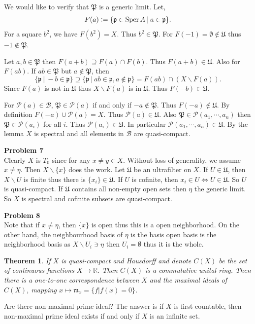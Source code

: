 \documentclass[10pt]{article}
\numberwithin{equation}{section}
\newtheorem{theorem}{Theorem} [section]
\DeclareMathOperator{\Sper}{Sper}
\newcommand{\defeq}{\vcentcolon=}
\newcommand{\m}[0]{\mathfrak{m}}
\newcommand{\R}[0]{\mathbb{R}}
\newcommand{\U}[0]{\mathfrak{U}}
\newcommand{\sep}[0]{\:|\:}
\newcommand{\p}[0]{\mathfrak{p}}
\begin{document}
 We would like to verify that $\mathfrak{P}$ is a generic limit. Let,
 \begin{equation*}
  F(a) \defeq \{\p\in\Sper A\sep a\in\p\}.
 \end{equation*} 
 For a square $b^2$, we have $F(b^2) = X$. Thus $b^2\in \mathfrak{P}$. For $F(-1) = \emptyset\not\in\U$ thus $-1\not\in \mathfrak{P}$.
 \par Let $a,b\in\mathfrak{P}$ then $F(a+b)\supseteq F(a)\cap F(b)$. Thus $F(a+b)\in\U$. Also for $F(ab)$. If $ab\in\mathfrak{P}$ but $a\not\in \mathfrak{P}$, then 
 \begin{equation*}
  \{\p\sep -b\in\p\}\supseteq\{\p\sep ab\in\p,a\not\in\p\} = F(ab)\cap (X\backslash F(a)).
 \end{equation*}
Since $F(a)$ is not in $\U$ thus $X\backslash F(a)$ is in $\U$. Thus $F(-b)\in\U$. 
\par For $\mathcal{P}(a)\in\mathcal{B}$, $\mathfrak{P}\in\mathcal{P}(a)$ if and only if $-a\not\in \mathfrak{P}$. Thus $F(-a)\not\in \U$. By definition $F(-a)\cup \mathcal{P}(a)=X$. Thus $\mathcal{P}(a)\in\U$.
Also $\mathfrak{P}\in\mathcal{P}(a_1,\cdots,a_n)$ then $\mathfrak{P}\in\mathcal{P}(a_i)$ for all $i$. Thus $\mathcal{P}(a_i)\in\U$. In particular $\mathcal{P}(a_1,\cdots,a_n)\in\U$. By the lemma $X$ is spectral and all elements in $\mathcal{B}$ are quasi-compact.
\par\textbf{Prroblem 7}\\
Clearly $X$ is $T_0$ since for any $x\not=y\in X$. Without loss of generality, we assume $x\not=\eta$. Then $X\backslash\{x\}$ does the work. Let $\U$ be an ultrafilter on $X$. If $U\in\U$, then $X\backslash U$ is finite thus there is $\{x_i\}\in \U$. If $U$ is cofinite, then $x_i\in U\Leftrightarrow U\in\U$. So $U$ is quasi-compact. If $\U$ contains all non-empty open sets then $\eta$ the generic limit. So $X$ is spectral and cofinite subsets are quasi-compact.
\par\textbf{Problem 8}\\
Note that if $x\not =\eta$, then $\{x\}$ is open thus this is a open neighborhood. On the other hand, the neighbourhood basis of $\eta$ is the basis open basis is the neighborhood basis as $X\backslash U_i\ni \eta$ then $U_i=\emptyset$ thus it is the whole.
\begin{theorem}
  If $X$ is quasi-compact and Hausdorff and denote $C(X)$ be the set of continuous functions $X\to \R$. Then $C(X)$ is a commutative unital ring. Then there is a one-to-one correspondence between $X$ and the maximal ideals of $C(X)$, mapping $x\mapsto \m_x = \{f|f(x)=0\}$.   
\end{theorem}
Are there non-maximal prime ideal? The answer is if $X$ is first countable, then non-maximal prime ideal exists if and only if $X$ is an infinite set.
\end{document}
